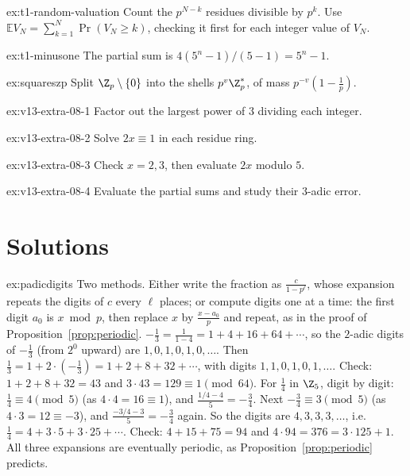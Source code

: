 \begin{hint}{ex:t1-random-valuation}
Count the $p^{N-k}$ residues divisible by $p^k$.
Use $\mathbb E V_N=\sum_{k=1}^N\operatorname{Pr}(V_N\ge k)$,
checking it first for each integer value of $V_N$.
\end{hint}

\begin{hint}{ex:t1-minusone}
The partial sum is $4(5^n-1)/(5-1)=5^n-1$.
\end{hint}

\begin{hint}{ex:squareszp}
Split $\Z_p\setminus\{0\}$ into the shells $p^v\Z_p^*$, of mass $p^{-v}(1-\frac1p)$.
\end{hint}

\begin{hint}{ex:v13-extra-08-1}
Factor out the largest power of $3$ dividing each integer.
\end{hint}

\begin{hint}{ex:v13-extra-08-2}
Solve $2x\equiv1$ in each residue ring.
\end{hint}

\begin{hint}{ex:v13-extra-08-3}
Check $x=2,3$, then evaluate $2x$ modulo $5$.
\end{hint}

\begin{hint}{ex:v13-extra-08-4}
Evaluate the partial sums and study their $3$-adic error.
\end{hint}

\section{Solutions}

\begin{solution}{ex:padicdigits}
\idea Two methods. Either write the fraction as $\frac c{1-p^\ell}$, whose expansion repeats the digits of $c$ every $\ell$ places; or compute digits one at a time: the first digit $a_0$ is $x\bmod p$, then replace $x$ by $\frac{x-a_0}p$ and repeat, as in the proof of Proposition~\ref{prop:periodic}.
\writeup $-\frac13=\frac1{1-4}=1+4+16+64+\cdots$, so the $2$-adic digits of $-\frac13$ (from $2^0$ upward) are $1,0,1,0,1,0,\dots$. Then $\frac13=1+2\cdot\left(-\frac13\right)=1+2+8+32+\cdots$, with digits $1,1,0,1,0,1,\dots$. Check: $1+2+8+32=43$ and $3\cdot43=129\equiv1\pmod{64}$. For $\frac14$ in $\Z_5$, digit by digit: $\frac14\equiv4\pmod5$ (as $4\cdot4=16\equiv1$), and $\frac{1/4-4}5=-\frac34$. Next $-\frac34\equiv3\pmod5$ (as $4\cdot3=12\equiv-3$), and $\frac{-3/4-3}5=-\frac34$ again. So the digits are $4,3,3,3,\dots$, i.e.\ $\frac14=4+3\cdot5+3\cdot25+\cdots$. Check: $4+15+75=94$ and $4\cdot94=376=3\cdot125+1$. All three expansions are eventually periodic, as Proposition~\ref{prop:periodic} predicts.
\end{solution}

